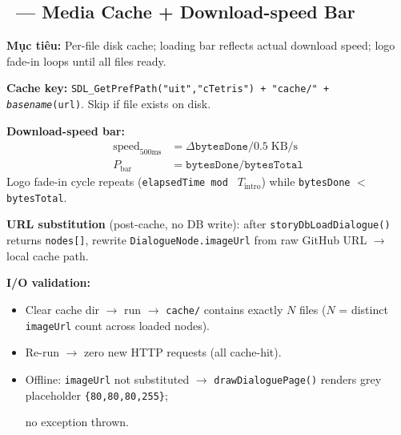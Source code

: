 \documentclass[12pt,a4paper]{article}
\begin{document}
\subsection{\Vthree\ --- Media Cache + Download-speed Bar}

\textbf{Mục tiêu:} Per-file disk cache; loading bar reflects actual download speed;
logo fade-in loops until all files ready.

\noindent\textbf{Cache key:}
\foreignlanguage{english}{\texttt{SDL\_GetPrefPath("uit","cTetris") + "cache/" + \textit{basename}(url)}}.
Skip if file exists on disk.

\noindent\textbf{Download-speed bar:}
\begin{align*}
  \text{speed}_{500\text{ms}} &= \Delta\texttt{bytesDone} / 0.5\;\text{KB/s} \\
  P_\text{bar}                &= \texttt{bytesDone} / \texttt{bytesTotal}
\end{align*}
Logo fade-in cycle repeats (\texttt{elapsedTime mod } $T_\text{intro}$)
while \texttt{bytesDone} $<$ \texttt{bytesTotal}.

\noindent\textbf{URL substitution} (post-cache, no DB write):
after \texttt{storyDbLoadDialogue()} returns \texttt{nodes[]},
rewrite \texttt{DialogueNode.imageUrl} from raw GitHub URL $\rightarrow$ local cache path.

\noindent\textbf{I/O validation:}
\begin{itemize}[nosep]
  \item Clear cache dir $\rightarrow$ run $\rightarrow$ \texttt{cache/} contains exactly $N$ files
        ($N$ = distinct \texttt{imageUrl} count across loaded nodes).

  \item Re-run $\rightarrow$ zero new HTTP requests (all cache-hit).
  \item Offline: \texttt{imageUrl} not substituted $\rightarrow$ \texttt{drawDialoguePage()}
        renders grey placeholder \texttt{\{80,80,80,255\}};

  no exception thrown.
\end{itemize}

\label{LastPageGameStoryEngineering}
\end{document}
